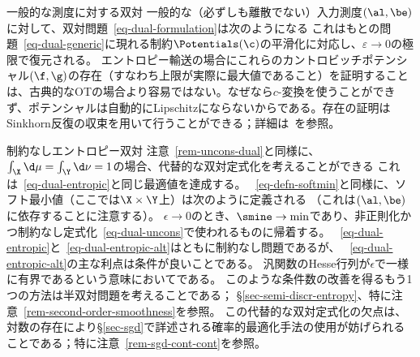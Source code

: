 \begin{rem2}{一般的な測度に対する双対}
一般的な（必ずしも離散でない）入力測度$(\al,\be)$に対して、双対問題~\eqref{eq-dual-formulation}は次のようになる
これはもとの問題~\eqref{eq-dual-generic}に現れる制約$\Potentials(\c)$の平滑化に対応し、$\varepsilon \rightarrow 0$の極限で復元される。
%
エントロピー輸送の場合にこれらのカントロビッチポテンシャル$(\f,\g)$の存在（すなわち上限が実際に最大値であること）を証明することは、古典的なOTの場合より容易ではない。なぜなら$c$-変換を使うことができず、ポテンシャルは自動的にLipschitzにならないからである。存在の証明はSinkhorn反復の収束を用いて行うことができる；詳細は~\citep{2016-chizat-sinkhorn}を参照。
\end{rem2}




\begin{rem2}{制約なしエントロピー双対}
注意~\ref{rem-uncons-dual}と同様に、$\int_\X \d\mu=\int_\Y\d\nu = 1$の場合、代替的な双対定式化を考えることができる
これは~\eqref{eq-dual-entropic}と同じ最適値を達成する。
%
~\eqref{eq-defn-softmin}と同様に、ソフト最小値（ここでは$\X \times \Y$上）は次のように定義される
（これは$(\al,\be)$に依存することに注意する）。
%
$\epsilon \rightarrow 0$のとき、$\smine \rightarrow \min$であり、非正則化かつ制約なし定式化~\eqref{eq-dual-uncons}で使われるものに帰着する。
%
~\eqref{eq-dual-entropic}と~\eqref{eq-dual-entropic-alt}はともに制約なし問題であるが、
~\eqref{eq-dual-entropic-alt}の主な利点は条件が良いことである。
汎関数のHesse行列が$\epsilon$で一様に有界であるという意味においてである。
このような条件数の改善を得るもう1つの方法は半双対問題を考えることである；
\S\ref{sec-semi-discr-entropy}、特に注意~\ref{rem-second-order-smoothness}を参照。
%
この代替的な双対定式化の欠点は、対数の存在により\S\ref{sec-sgd}で詳述される確率的最適化手法の使用が妨げられることである；特に注意~\ref{rem-sgd-cont-cont}を参照。
\end{rem2}

